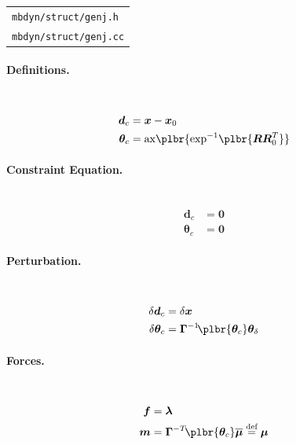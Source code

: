 \documentclass[10pt,fleqn,subeqn]{report}
\newcommand{\T}[1]{\bm{#1}}
\newcommand{\TT}[1]{\bm{#1}}
\begin{document}
\begin{tabular}{l}
\texttt{mbdyn/struct/genj.h} \\
\texttt{mbdyn/struct/genj.cc}
\end{tabular}

\paragraph{Definitions.} \
\begin{align}
	\T{d}_c &= \T{x} - \T{x}_0 \\
	\T{\theta}_c &= \mathrm{ax}\plbr{\mathrm{exp}^{-1}\plbr{\TT{R}\TT{R}_0^T}}
\end{align}

\paragraph{Constraint Equation.} \
\begin{align}
	\T{d}_c &= \T{0} \\
	\T{\theta}_c &= \T{0}
\end{align}

\paragraph{Perturbation.} \
\begin{align}
	\delta\T{d}_c &= \delta\T{x} \\
	\delta\T{\theta}_c &= \TT{\Gamma}^{-1}\!\plbr{\T{\theta}_c} \T{\theta}_{\delta}
\end{align}

\paragraph{Forces.} \
\begin{subequations}
\begin{align}
	\T{f} &= \T{\lambda} \\
	\T{m} &= \TT{\Gamma}^{-T}\!\plbr{\T{\theta}_c} \overline{\T{\mu}}
	\overset{\text{def}}{=} \T{\mu}
\end{align}
\end{subequations}
\end{document}
